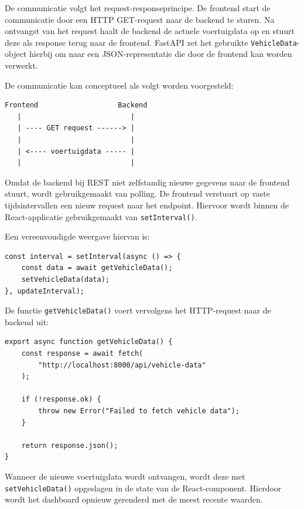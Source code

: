 De communicatie volgt het request-responseprincipe. De frontend start de
communicatie door een HTTP GET-request naar de backend te sturen. Na ontvangst
van het request haalt de backend de actuele voertuigdata op en stuurt deze als
response terug naar de frontend. FastAPI zet het gebruikte
\texttt{VehicleData}-object hierbij om naar een JSON-representatie die door de
frontend kan worden verwerkt.

De communicatie kan conceptueel als volgt worden voorgesteld:

\begin{verbatim}
Frontend                   Backend
   |                          |
   | ---- GET request ------> |
   |                          |
   | <---- voertuigdata ----- |
   |                          |
\end{verbatim}

Omdat de backend bij REST niet zelfstandig nieuwe gegevens naar de frontend
stuurt, wordt gebruikgemaakt van polling. De frontend verstuurt op vaste
tijdsintervallen een nieuw request naar het endpoint. Hiervoor wordt binnen de
React-applicatie gebruikgemaakt van \texttt{setInterval()}.

Een vereenvoudigde weergave hiervan is:

\begin{listing}[H]
\begin{verbatim}
const interval = setInterval(async () => {
    const data = await getVehicleData();
    setVehicleData(data);
}, updateInterval);
\end{verbatim}
\caption{Polling van voertuigdata}
\label{lst:rest-vehicle-data}
\end{listing}

De functie \texttt{getVehicleData()} voert vervolgens het HTTP-request naar de
backend uit:

\begin{verbatim}
export async function getVehicleData() {
    const response = await fetch(
        "http://localhost:8000/api/vehicle-data"
    );

    if (!response.ok) {
        throw new Error("Failed to fetch vehicle data");
    }

    return response.json();
}
\end{verbatim}

Wanneer de nieuwe voertuigdata wordt ontvangen, wordt deze met
\texttt{setVehicleData()} opgeslagen in de state van de React-component.
Hierdoor wordt het dashboard opnieuw gerenderd met de meest recente waarden.

